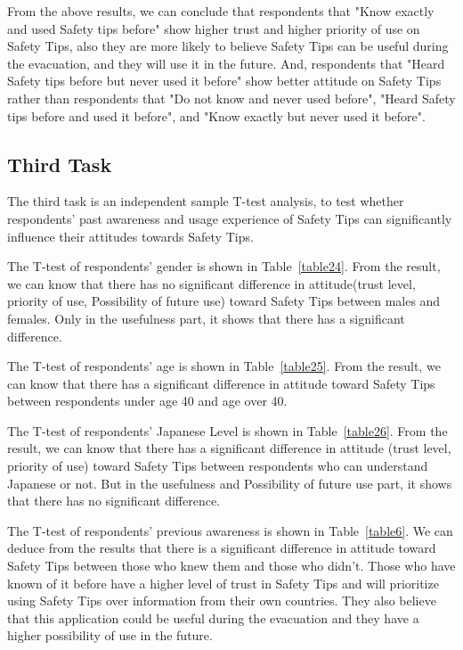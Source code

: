 From the above results, we can conclude that respondents that "Know exactly and used Safety tips before" show higher trust and higher priority of use on Safety Tips, also they are more likely to believe Safety Tips can be useful during the evacuation, and they will use it in the future. And, respondents that "Heard Safety tips before but never used it before" show better attitude on Safety Tips rather than respondents that "Do not know and never used before", "Heard Safety tips before and used it before", and "Know exactly but never used it before".

\subsection{Third Task}

The third task is an independent sample T-test analysis, to test whether respondents' past awareness and usage experience of Safety Tips can significantly influence their attitudes towards Safety Tips. 

The T-test of respondents' gender is shown in Table~\ref{table24}. From the result, we can know that there has no significant difference in attitude(trust level, priority of use, Possibility of future use) toward Safety Tips between males and females. Only in the usefulness part, it shows that there has a significant difference. 

The T-test of respondents' age is shown in Table~\ref{table25}. From the result, we can know that there has a significant difference in attitude toward Safety Tips between respondents under age 40 and age over 40. 

The T-test of respondents' Japanese Level is shown in Table~\ref{table26}. From the result, we can know that there has a significant difference in attitude (trust level, priority of use) toward Safety Tips between respondents who can understand Japanese or not. But in the usefulness and Possibility of future use part, it shows that there has no significant difference. 


The T-test of respondents' previous awareness is shown in Table~\ref{table6}. We can deduce from the results that there is a significant difference in attitude toward Safety Tips between those who knew them and those who didn't. Those who have known of it before have a higher level of trust in Safety Tips and will prioritize using Safety Tips over information from their own countries. They also believe that this application could be useful during the evacuation and they have a higher possibility of use in the future. 

